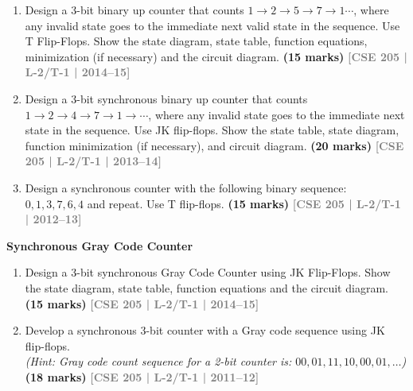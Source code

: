 \documentclass[12pt,a3paper]{article}
\newcommand{\yr}[1]{\hfill\textcolor{gray}{\small\textbf{[#1]}}}
\newcommand{\mk}[1]{\textcolor{orange!70!black}{\small\textbf{(#1 marks)}}}
\newcommand{\subtopic}[2]{%
  \vspace{10pt}
  \noindent\begin{tcolorbox}[colback=#1!8,colframe=#1,boxrule=0.6pt,arc=4pt,
    left=6pt,right=6pt,top=4pt,bottom=4pt]
    \small\bfseries\textcolor{#1}{#2}
  \end{tcolorbox}
  \vspace{2pt}
}
\begin{document}
\begin{enumerate}
\begin{center}
\end{center}

\mk{12} \yr{CSE 205 | L-2/T-1 | 2015--16}


\item Design a 3-bit binary up counter that counts $1 \to 2 \to 5 \to 7 \to 1\cdots$, where any invalid state goes to the immediate next valid state in the sequence. Use T Flip-Flops. Show the state diagram, state table, function equations, minimization (if necessary) and the circuit diagram.
\mk{15} \yr{CSE 205 | L-2/T-1 | 2014--15}


\item Design a 3-bit synchronous binary up counter that counts $1 \to 2 \to 4 \to 7 \to 1 \to \cdots$, where any invalid state goes to the immediate next state in the sequence. Use JK flip-flops. Show the state table, state diagram, function minimization (if necessary), and circuit diagram.
\mk{20} \yr{CSE 205 | L-2/T-1 | 2013--14}


\item Design a synchronous counter with the following binary sequence: $0, 1, 3, 7, 6, 4$ and repeat. Use T flip-flops.
\mk{15} \yr{CSE 205 | L-2/T-1 | 2012--13}

\end{enumerate}

\subtopic{cG}{Synchronous Gray Code Counter}
\label{sub:s7-gray}

\begin{enumerate}

\item Design a 3-bit synchronous Gray Code Counter using JK Flip-Flops. Show the state diagram, state table, function equations and the circuit diagram.
\mk{15} \yr{CSE 205 | L-2/T-1 | 2014--15}

\item Develop a synchronous 3-bit counter with a Gray code sequence using JK flip-flops.\\
\textit{(Hint: Gray code count sequence for a 2-bit counter is: $00, 01, 11, 10, 00, 01, \ldots$)}
\mk{18} \yr{CSE 205 | L-2/T-1 | 2011--12}


\end{enumerate}
\end{document}
